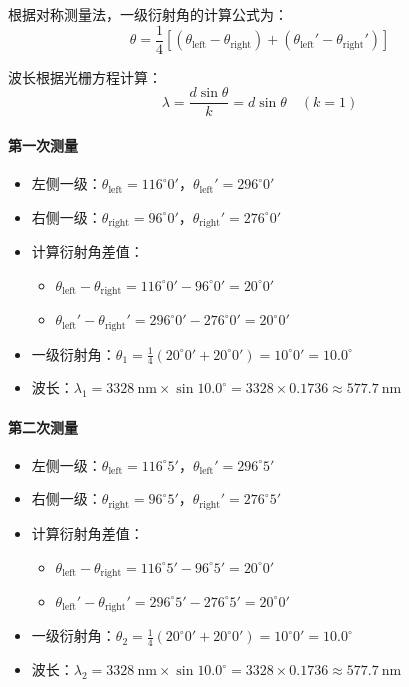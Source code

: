 \documentclass[11pt]{article}
\begin{document}
根据对称测量法，一级衍射角的计算公式为：
\[
\theta = \frac{1}{4}\left[(\theta_{\text{left}} - \theta_{\text{right}}) + (\theta_{\text{left}}' - \theta_{\text{right}}')\right]
\]

波长根据光栅方程计算：
\[
\lambda = \frac{d\sin\theta}{k} = d\sin\theta \quad (k=1)
\]

\paragraph{第一次测量}

\begin{itemize}[itemsep=0.3ex]
\item 左侧一级：\(\theta_{\text{left}} = 116^\circ0'\)，\(\theta_{\text{left}}' = 296^\circ0'\)
\item 右侧一级：\(\theta_{\text{right}} = 96^\circ0'\)，\(\theta_{\text{right}}' = 276^\circ0'\)
\item 计算衍射角差值：
  \begin{itemize}
  \item \(\theta_{\text{left}} - \theta_{\text{right}} = 116^\circ0' - 96^\circ0' = 20^\circ0'\)
  \item \(\theta_{\text{left}}' - \theta_{\text{right}}' = 296^\circ0' - 276^\circ0' = 20^\circ0'\)
  \end{itemize}
\item 一级衍射角：\(\theta_1 = \frac{1}{4}(20^\circ0' + 20^\circ0') = 10^\circ0' = 10.0^\circ\)
\item 波长：\(\lambda_1 = 3328\ \text{nm} \times \sin 10.0^\circ = 3328 \times 0.1736 \approx 577.7\ \text{nm}\)
\end{itemize}

\paragraph{第二次测量}

\begin{itemize}[itemsep=0.3ex]
\item 左侧一级：\(\theta_{\text{left}} = 116^\circ5'\)，\(\theta_{\text{left}}' = 296^\circ5'\)
\item 右侧一级：\(\theta_{\text{right}} = 96^\circ5'\)，\(\theta_{\text{right}}' = 276^\circ5'\)
\item 计算衍射角差值：
  \begin{itemize}
  \item \(\theta_{\text{left}} - \theta_{\text{right}} = 116^\circ5' - 96^\circ5' = 20^\circ0'\)
  \item \(\theta_{\text{left}}' - \theta_{\text{right}}' = 296^\circ5' - 276^\circ5' = 20^\circ0'\)
  \end{itemize}
\item 一级衍射角：\(\theta_2 = \frac{1}{4}(20^\circ0' + 20^\circ0') = 10^\circ0' = 10.0^\circ\)
\item 波长：\(\lambda_2 = 3328\ \text{nm} \times \sin 10.0^\circ = 3328 \times 0.1736 \approx 577.7\ \text{nm}\)
\end{itemize}
\end{document}
